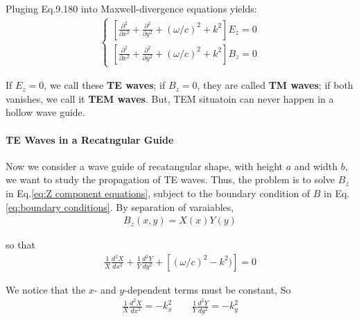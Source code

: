 \documentclass{article}
\begin{document}
    Pluging Eq.9.180 into Maxwell-divergence equations yields:
    \begin{align}
        \label{eq:Z component equations}
        \begin{cases}
            \left[ \frac{\partial^2}{\partial x^2} + \frac{\partial^2}{\partial y^2} +(\omega/c)^2 + k^2 \right] E_z = 0 \\
            \left[ \frac{\partial^2}{\partial x^2} + \frac{\partial^2}{\partial y^2} +(\omega/c)^2 + k^2 \right] B_z = 0
        \end{cases}
    \end{align}

    If $E_z=0$, we call these \textbf{TE waves}; if $B_z=0$, they are called \textbf{TM waves};
    if both vanishes, we call it \textbf{TEM waves}. But, TEM situatoin can never happen in
    a hollow wave guide.
    
    \paragraph{TE Waves in a Recatngular Guide} %
    \label{par:TE Waves in a Recatngular Guide}
        Now we consider a wave guide of recatangular shape, with height $a$ and width $b$,
        we want to study the propagation of TE waves.
        Thus, the problem is to solve $B_z$ in Eq.\eqref{eq:Z component equations}, subject
        to the boundary condition of $B$ in Eq.\eqref{eq:boundary conditions}. By separation of
        varaiables,
        \begin{align}
            B_z(x, y) = X(x) Y(y)
        \end{align}

        so that 
        \begin{align}
            \frac{1}{X} \frac{d^2 X}{dx^2} +\frac{1}{Y} \frac{d^2 Y}{dy^2}
            + \left[ (\omega/c)^2 -k^2 ) \right] =0
        \end{align}

        We notice that the $x$- and $y$-dependent terms must be constant, So
        \begin{align}
            \frac{1}{X} \frac{d^2 X}{dx^2} = -k_x^2 \qquad \frac{1}{Y} \frac{d^2 Y}{dy^2} =-k_y^2
        \end{align}
\end{document}
